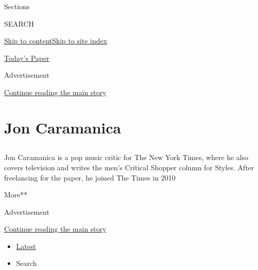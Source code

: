 Sections

SEARCH

\protect\hyperlink{site-content}{Skip to
content}\protect\hyperlink{site-index}{Skip to site index}

\href{https://myaccount.nytimes3xbfgragh.onion/auth/login?response_type=cookie\&client_id=vi}{}

\href{https://www.nytimes3xbfgragh.onion/section/todayspaper}{Today's
Paper}

Advertisement

\protect\hyperlink{after-top}{Continue reading the main story}

\hypertarget{jon-caramanica}{%
\section{Jon Caramanica}\label{jon-caramanica}}

\subsection{}

Jon Caramanica is a pop music critic for The New York Times, where he
also covers television and writes the men's Critical Shopper column for
Styles. After freelancing for the paper, he joined The Times in 2010

More**

Advertisement

\protect\hyperlink{after-mid1}{Continue reading the main story}

\begin{itemize}
\tightlist
\item
  \protect\hyperlink{stream-panel}{Latest}
\item
  Search
\end{itemize}

